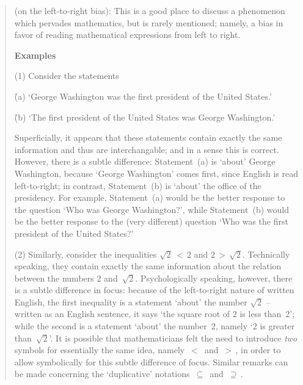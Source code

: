 \begin{quotation}
{\footnotesize \underline{\Note} (on the left-to-right bias):
    This is a good place to discuss a phenomenon which pervades mathematics, but is rarely mentioned;
    namely, a bias in favor of reading mathematical expressions from left to right.

\V

        {\bf Examples}


        (1) Consider the statements

        \h (a) `George Washington was the first president of the United States.'

        \h (b) `The first president of the United States was George Washington.'

\noindent Superficially, it appears that these statements contain exactly the same information and thus are interchangable; and in a sense this is correct.
    However, there is a subtle difference: Statement~(a) is `about' George Washington,
    because `George Washington' comes first, since English is read left-to-right; in contrast, Statement~(b) is `about' the office of the presidency.
    For example, Statement~(a) would be the better response to the question `Who was George Washington?',
    while Statement~(b) would be the better response to the (very different) question `Who was the first president of the United States?'

\V

        (2) Similarly, consider the inequalities $\sqrt{2}\,<\,2$ and $2\,>\,\sqrt{2}$. 
    Technically speaking, they contain exactly the same information about the relation between the numbers $2$ and~$\sqrt{2}$.
    Psychologically speaking, however, there is a subtle difference in focus: because of the left-to-right nature of written English,
    the first inequality is a statement `about' the number $\sqrt{2}$ -- written as an English sentence, it says `the square root of $2$ is less than~$2$';
    while the second is a statement `about' the number~$2$, namely `$2$ is greater than~$\sqrt{2}$'.
    It is possible that mathematicians felt the need to introduce {\em two} symbols for essentially the same idea,
    namely $\,<\,$ and $\,>\,$, in order to allow symbolically for this subtle difference of focus.
    Similar remarks can be made concerning the `duplicative' notations $ \,{\subseteq}\, $ and $ \,{\supseteq}\, $.

\V

}
\end{quotation}
